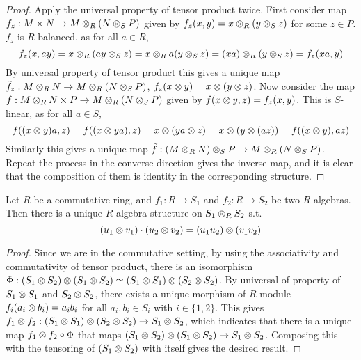 \documentclass{article}
\begin{document}
\begin{proof}
    Apply the universal property of tensor product twice. First consider map $f_z: M \times N \to M \otimes_R (N \otimes_S P)$ given by $f_z(x, y) = x \otimes_R (y \otimes_S z)$ for some $z \in P$. $f_z$ is $R$-balanced, as for all $a \in R$, 
    \[
        f_z(x, ay) = x\otimes_R (ay \otimes_S z) = x \otimes_R a(y \otimes_S z) = (xa) \otimes_R (y \otimes_S z) = f_z(xa, y)
    \]
    By universal property of tensor product this gives a unique map $\tilde{f_z}: M \otimes_R N \to M \otimes_R (N \otimes_S P)$, $f_z(x \otimes y) = x \otimes (y \otimes z)$. Now consider the map $f: M \otimes_R N \times P \to M \otimes_R (N \otimes_S P)$ given by $f(x \otimes y, z) = f_z(x, y)$. This is $S$-linear, as for all $a \in S$,
    \[
        f((x \otimes y)a, z) = f((x \otimes ya), z) = x \otimes (ya \otimes z) = x \otimes (y \otimes (az)) = f((x \otimes y), az)
    \]
    Similarly this gives a unique map $\tilde{f}: (M \otimes_R N) \otimes_S P \to M \otimes_R (N \otimes_S P)$. Repeat the process in the converse direction gives the inverse map, and it is clear that the composition of them is identity in the corresponding structure.
\end{proof}

\begin{proposition}
    Let $R$ be a commutative ring, and $f_1: R \to S_1$ and $f_2: R \to S_2$ be two $R$-algebras. Then there is a unique $R$-algebra structure on $S_1 \otimes_R S_2$ s.t. 
    \[
        (u_1 \otimes v_1) \cdot (u_2 \otimes v_2) = (u_1 u_2) \otimes (v_1 v_2)
    \]
\end{proposition}

\begin{proof}
    Since we are in the commutative setting, by using the associativity and commutativity of tensor product, there is an isomorphism $\Phi: (S_1 \otimes S_2) \otimes (S_1 \otimes S_2) \simeq (S_1 \otimes S_1) \otimes (S_2 \otimes S_2)$. By universal of property of $S_1 \otimes S_1$ and $S_2 \otimes S_2$, there exists a unique morphism of $R$-module $f_i(a_i \otimes b_i) = a_i b_i$ for all $a_i, b_i \in S_i$ with $i\in \{1, 2\}$. This gives $f_1 \otimes f_2: (S_1 \otimes S_1) \otimes (S_2 \otimes S_2) \to S_1 \otimes S_2$, which indicates that there is a unique map $f_1 \otimes f_2 \circ \Phi$ that maps $(S_1 \otimes S_2) \otimes (S_1 \otimes S_2) \to S_1 \otimes S_2$. Composing this with the tensoring of $(S_1 \otimes S_2)$ with itself gives the desired result.
\end{proof}
\end{document}
